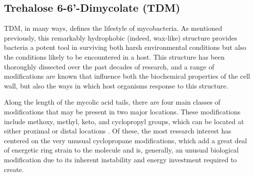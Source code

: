 \subsection{Trehalose 6-6'-Dimycolate (TDM)}\label{tdm}

TDM, in many ways, defines the lifestyle of mycobacteria. As mentioned previously, this remarkably hydrophobic (indeed, wax-like) structure provides bacteria a potent tool in surviving both harsh environmental conditions but also the conditions likely to be encountered in a host. This structure has been thoroughly dissected over the past decades of research, and a range of modifications are known that influence both the biochemical properties of the cell wall, but also the ways in which host organisms response to this structure. 

Along the length of the mycolic acid tails, there are four main classes of modifications that may be present in two major locations. These modifications include methoxy, methyl, keto, and cyclopropyl groups, which can be located at either proximal or distal locations \citep{Takayama2005, Rao2005, Rao2006, Bhatt2008, Sugawara2002, Walton2018, Barkan2009}. Of these, the most research interest has centered on the very unusual cyclopropane modifications, which add a great deal of energetic ring strain to the molecule and is, generally, an unusual biological modification due to its inherent instability and energy investment required to create.

